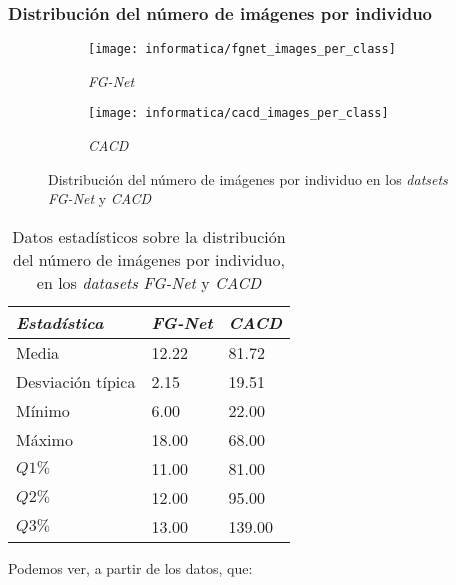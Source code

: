 \subsubsection{Distribución del número de imágenes por individuo}

\begin{figure}[H]
\centering
    \begin{subfigure}{.5\textwidth}
        \centering
        \texttt{[image: informatica/fgnet\_images\_per\_class]}
        \caption{\textit{FG-Net}}
    \end{subfigure}%
    \begin{subfigure}{.5\textwidth}
        \centering
        \texttt{[image: informatica/cacd\_images\_per\_class]}
        \caption{\textit{CACD}}
    \end{subfigure}
\caption{Distribución del número de imágenes por individuo en los \textit{datsets} \textit{FG-Net} y \textit{CACD} }
\end{figure}


\begin{table}[H]
\centering
\begin{tabular}{|l|l|l|}
    \hline
    \textbf{\textit{Estadística}} & \textbf{\textit{FG-Net}} & \textbf{\textit{CACD}} \\
    \hline

    Media             & 12.22 & 81.72  \\
    Desviación típica & 2.15  & 19.51  \\
    Mínimo            & 6.00  & 22.00  \\
    Máximo            & 18.00 & 68.00  \\
    $Q1 \%$           & 11.00 & 81.00  \\
    $Q2 \%$           & 12.00 & 95.00  \\
    $Q3 \%$           & 13.00 & 139.00 \\

    \hline

\end{tabular}
\caption{Datos estadísticos sobre la distribución del número de imágenes por individuo, en los \textit{datasets} \textit{FG-Net} y \textit{CACD}}
\end{table}

Podemos ver, a partir de los datos, que:

